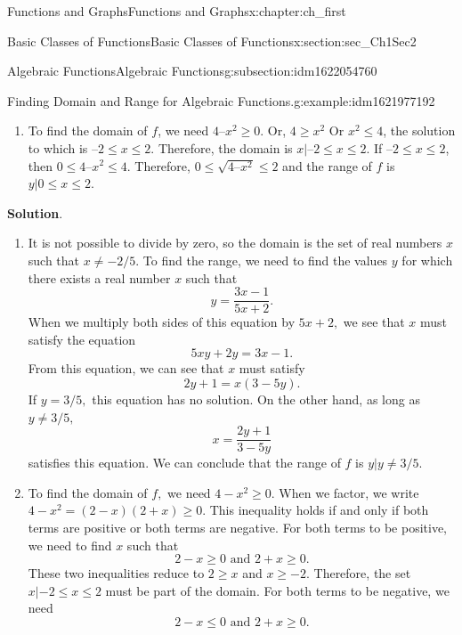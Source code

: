 \documentclass[oneside,10pt,]{book}
\newcommand{\blocktitlefont}{\relax}
\numberwithin{equation}{section}
\begin{document}
\begin{chapterptx}{Functions and Graphs}{}{Functions and Graphs}{}{}{x:chapter:ch_first}
\begin{sectionptx}{Basic Classes of Functions}{}{Basic Classes of Functions}{}{}{x:section:sec_Ch1Sec2}
\begin{subsectionptx}{Algebraic Functions}{}{Algebraic Functions}{}{}{g:subsection:idm1622054760}
\begin{example}{Finding Domain and Range for Algebraic Functions.}{g:example:idm1621977192}
\begin{enumerate}
\item{}To find the domain of \(f\), we need \(4 –x^2 \geq  0 \). Or, \(4 \geq x^2 \) Or \(x^2 \leq   4 \), the solution to which is \(– 2 \leq  x\leq   2 \). Therefore, the domain is \({x|– 2 \leq  x\leq   2 }\). If \(– 2 \leq  x\leq   2 \), then \(0 \leq   4 –x^2 \leq   4 \). Therefore, \(0 \leq  \sqrt{ 4 –x^2 }\leq   2 \) and the range of \(f\) is \({y| 0 \leq  x\leq   2 }\).%
\end{enumerate}
\par\smallskip%
\noindent\textbf{\blocktitlefont Solution}.\hypertarget{g:solution:idm1621970152}{}\quad{}%
\begin{enumerate}
\item{}It is not possible to divide by zero, so the domain is the set of real numbers \(x\) such that \(x\neq - 2  / 5 .\) To find the range, we need to find the values \(y\) for which there exists a real number \(x\) such that%
\begin{equation*}
y=\frac{ 3 x- 1}{ 5 x+ 2 }.
\end{equation*}
When we multiply both sides of this equation by \(5 x+ 2 ,\) we see that \(x\) must satisfy the equation%
\begin{equation*}
5 xy+ 2 y= 3 x- 1 .
\end{equation*}
From this equation, we can see that \(x\) must satisfy%
%
\begin{equation*}
2 y+ 1 =x( 3 - 5 y).
\end{equation*}
If \(y= 3  / 5 ,\) this equation has no solution. On the other hand, as long as \(y\neq  3  / 5 ,\)%
\begin{equation*}
x=\frac{ 2 y+ 1 }{ 3 - 5 y}
\end{equation*}
satisfies this equation. We can conclude that the range of \(f\) is \({y|y\neq  3  / 5 }.\)%
\item{}To find the domain of \(f,\) we need \(4 -x^2 \geq  0 .\) When we factor, we write \(4 -x^2 =( 2 -x)( 2 +x)\geq  0 .\) This inequality holds if and only if both terms are positive or both terms are negative. For both terms to be positive, we need to find \(x\) such that%
\begin{equation*}
2 -x\geq  0  \text{ and }  2 +x\geq  0 .
\end{equation*}
These two inequalities reduce to \(2 \geq x\) and \(x\geq  -2 .\) Therefore, the set \({x|- 2 \leq  x\leq   2 }\) must be part of the domain. For both terms to be negative, we need%
\begin{equation*}
2 -x\leq   0  \text{ and }  2 +x\geq  0 .

\end{equation*}
\end{enumerate}
\end{example}
\end{subsectionptx}
\end{sectionptx}
\end{chapterptx}
\end{document}
